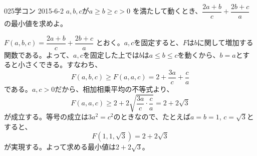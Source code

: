\begin{thm}{025}{}{学コン 2015-6-2}
 $a,b,c$が$a \ge b \ge c > 0$ を満たして動くとき、$\dfrac{2a+b}{c}+\dfrac{2b+c}{a}$の最小値を求めよ。
\end{thm}

$F(a, b, c)=\dfrac{2a+b}{c}+\dfrac{2b+c}{a}$ とおく。$a, c$を固定すると、$F$は$b$に関して増加する関数である。よって、$a, c$を固定した上では$b$は$a\le b\le c$を動くから、$b=a$とすると小さくできる。すなわち、
\[ F(a, b, c)\ge F(a, a, c)=2+\frac{3a}{c}+\frac{c}{a} \]
である。$a, c>0$だから、相加相乗平均の不等式より、
\[ F(a, a, c)\ge 2+2\sqrt{\frac{3a}{c}\cdot\frac{c}{a}}=2+2\sqrt{3} \]
が成立する。等号の成立は$3a^2=c^2$のときなので、たとえば$a=b=1$, $c=\sqrt{3}$とすると、
\[ F(1, 1, \sqrt{3})=2+2\sqrt{3} \]
が実現する。よって求める最小値は$2+2\sqrt{3}$。